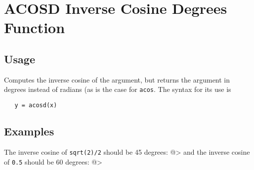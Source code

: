 \section{ACOSD Inverse Cosine Degrees Function}

\subsection{Usage}

Computes the inverse cosine of the argument, but returns
the argument in degrees instead of radians (as is the case
for \verb|acos|. The syntax for its use is
\begin{verbatim}
   y = acosd(x)
\end{verbatim}
\subsection{Examples}

The inverse cosine of \verb|sqrt(2)/2| should be 45 degrees:
@>
and the inverse cosine of \verb|0.5| should be 60 degrees:
@>
